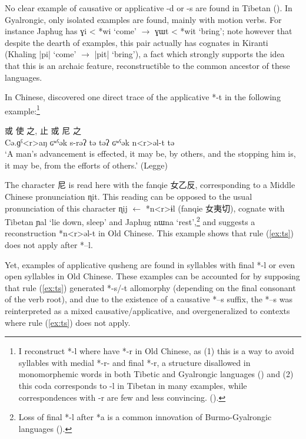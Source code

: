 \documentclass[oldfontcommands,oneside,a4paper,11pt]{article}
\newcommand{\ipa}[1]{{\phon \mbox{#1}}} %
\newcommand{\zh}[1]{{\cn #1}}
\begin{document}
No clear example of causative or applicative \ipa{-d} or \ipa{-s} are found in Tibetan (\citealt[630]{hill14derivational}). In Gyalrongic, only isolated examples are found, mainly with motion verbs. For instance Japhug has \ipa{ɣi} < *\ipa{wi} `come' $\rightarrow$ \ipa{ɣɯt} <  *\ipa{wit} `bring'; note however that despite  the dearth of examples, this pair actually has cognates in Kiranti (Khaling \ipa{|pi|} `come' $\rightarrow$ \ipa{|pit|} `bring'), a fact which strongly supports the idea that this is an archaic feature, reconstructible to the common ancestor of these languages.

In Chinese, \citet{sagart04directions} discovered one direct trace of the applicative *\ipa{-t}  in the following example:\footnote{I reconstruct *\ipa{-l} where \citealt{bs14oc} have *\ipa{-r} in Old Chinese, as (1) this is a way to avoid syllables with medial *\ipa{-r-} and final *\ipa{-r}, a structure disallowed in monomorphemic words in both Tibetic and Gyalrongic languages (\citealt{jacques04these}) and (2) this coda corresponds to \ipa{-l}  in Tibetan in many examples, while correspondences with \ipa{-r} are few and less convincing. (\citealt[101-2]{hill14jrn}).  } 

 

\begin{exe}
\ex 
\gll \zh{行} \zh{或} \zh{使} \zh{之}, \zh{止} \zh{或} \zh{尼} \zh{之} \\
 \ipa{Cə.ɡˁ<r>aŋ}  \ipa{ɢʷˁək}  \ipa{s-rəʔ}  \ipa{tə}  \ipa{təʔ}  \ipa{ɢʷˁək}  \ipa{n<r>əl-t}  \ipa{tə} \\
\glt `A man's advancement is effected, it may be, by others, and the stopping him is, it may be, from the efforts of others.' (Legge)
\end{exe}

The character \zh{尼} is read here with the fanqie \zh{女乙反}, corresponding to a Middle Chinese pronunciation \ipa{ɳit}. This reading can be opposed to the usual pronunciation of this character \ipa{ɳij} $\leftarrow$ *\ipa{n<r>ɨl}  (fanqie \zh{女夷切}), cognate with Tibetan \ipa{ɲal} `lie down, sleep' and Japhug \ipa{nɯna} `rest',\footnote{Loss of final *\ipa{-l} after *\ipa{a} is a common innovation of Burmo-Gyalrongic languages (\citealt{jacques.michaud11naish}).} and suggests a reconstruction *\ipa{n<r>əl-t} in Old Chinese. This example shows that rule (\ref{ex:ts}) does not apply after *\ipa{--l}.

 Yet, examples of  applicative qusheng are found in syllables with final *\ipa{-l} or even open syllables in Old Chinese. These examples can be accounted for by supposing that rule (\ref{ex:ts}) generated *\ipa{-s}/\ipa{-t} allomorphy (depending on the final consonant of the verb root), and due to the existence of a causative *\ipa{--s} suffix, the *\ipa{--s} was reinterpreted as a mixed causative/applicative, and overgeneralized to contexts where rule (\ref{ex:ts}) does not apply.
 
\end{document}
